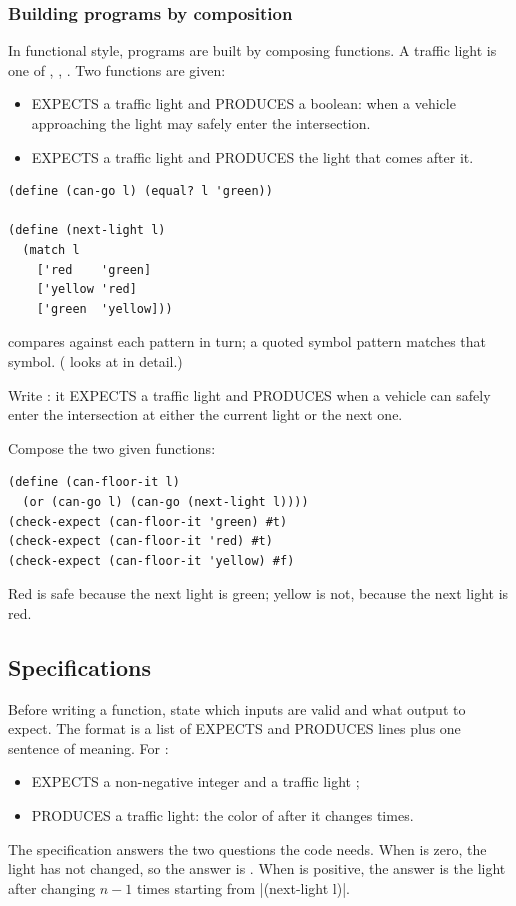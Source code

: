 \subsubsection{Building programs by composition} In functional style, programs are built by composing functions. A traffic light is one of , , . Two functions are given:
\begin{itemize}
  \item {} EXPECTS a traffic light and PRODUCES a boolean:  when a vehicle approaching the light may safely enter the intersection.
  \item {} EXPECTS a traffic light and PRODUCES the light that comes after it.
\end{itemize}
\begin{lstlisting}
(define (can-go l) (equal? l 'green))

(define (next-light l)
  (match l
    ['red    'green]
    ['yellow 'red]
    ['green  'yellow]))
\end{lstlisting}
 compares  against each pattern in turn; a quoted symbol pattern matches that symbol. ( looks at  in detail.)

\begin{exercise}
Write : it EXPECTS a traffic light and PRODUCES  when a vehicle can safely enter the intersection at either the current light or the next one.
\end{exercise}
\begin{solution}
Compose the two given functions:
\begin{lstlisting}
(define (can-floor-it l)
  (or (can-go l) (can-go (next-light l))))
(check-expect (can-floor-it 'green) #t)
(check-expect (can-floor-it 'red) #t)
(check-expect (can-floor-it 'yellow) #f)
\end{lstlisting}
Red is safe because the next light is green; yellow is not, because the next light is red.
\end{solution}

\subsection{Specifications}

Before writing a function, state which inputs are valid and what output to expect. The format is a list of EXPECTS and PRODUCES lines plus one sentence of meaning. For :
\begin{itemize}
  \item EXPECTS a non-negative integer  and a traffic light ;
  \item PRODUCES a traffic light: the color of  after it changes  times.
\end{itemize}
The specification answers the two questions the code needs. When  is zero, the light has not changed, so the answer is . When  is positive, the answer is the light after changing $n-1$ times starting from \rkt|(next-light l)|.

